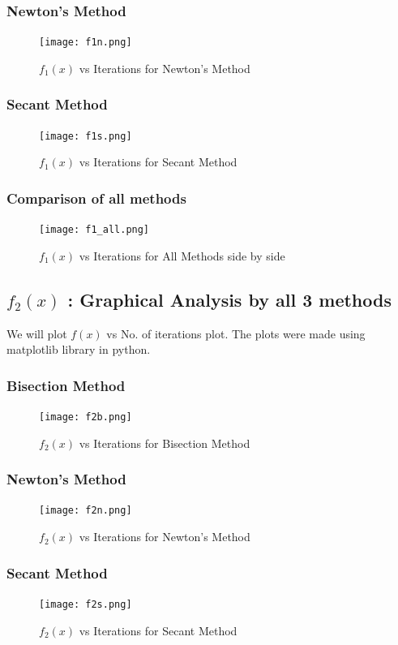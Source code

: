 \documentclass[12pt]{article}
\begin{document}
\subsubsection{Newton's Method}
\begin{figure}[H]
    \centering
    \texttt{[image: f1n.png]}
    \caption{$f_1(x)$ vs Iterations for Newton's Method}
\end{figure}

\subsubsection{Secant Method}
\begin{figure}[H]
    \centering
    \texttt{[image: f1s.png]}
    \caption{$f_1(x)$ vs Iterations for Secant Method}
\end{figure}

\subsubsection{Comparison of all methods}
\begin{figure}[H]
    \centering
    \texttt{[image: f1\_all.png]}
    \caption{$f_1(x)$ vs Iterations for All Methods side by side}
\end{figure}

\newpage
\subsection{$f_2(x)$ : Graphical Analysis by all 3 methods}
We will plot $f(x)$ vs No. of iterations plot. The plots were made using matplotlib library in python.
\subsubsection{Bisection Method}
\begin{figure}[H]
    \centering
    \texttt{[image: f2b.png]}
    \caption{$f_2(x)$ vs Iterations for Bisection Method}
\end{figure}

\subsubsection{Newton's Method}
\begin{figure}[H]
    \centering
    \texttt{[image: f2n.png]}
    \caption{$f_2(x)$ vs Iterations for Newton's Method}
\end{figure}

\subsubsection{Secant Method}
\begin{figure}[H]
    \centering
    \texttt{[image: f2s.png]}
    \caption{$f_2(x)$ vs Iterations for Secant Method}
\end{figure}
\end{document}
